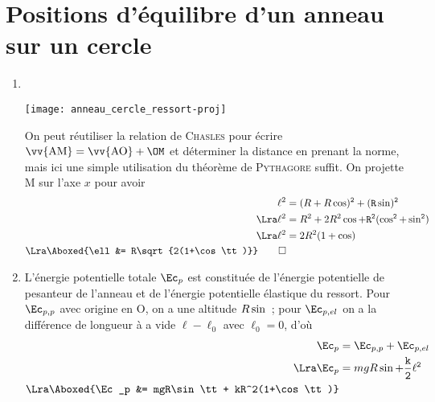 \documentclass[a4paper, 12pt, final, garamond]{book}
\begin{document}
\section{Positions d'équilibre d'un anneau sur un cercle}
\begin{enumerate}
    \item
        \begin{minipage}[t]{0.25\linewidth}
            ~
            \begin{center}
                \texttt{[image: anneau\_cercle\_ressort-proj]}
                \captionsetup{justification=centering}
                \label{fig:anncercproj}
            \end{center}
        \end{minipage}
        \hfill
        \begin{minipage}[t]{0.70\linewidth}
            On peut réutiliser la relation de \textsc{Chasles} pour écrire
            $\vv{\rm AM} = \vv{\rm AO} + \OM$ et déterminer la distance en prenant
            la norme, mais ici une simple utilisation du théorème de
            \textsc{Pythagore} suffit. On projette M sur l'axe $x$ pour avoir
            \begin{align*}
                \ell^2 &= (R+R\cos\tt)^2 + (R\sin\tt)^2
                \\\Lra
                \ell^2 &= R^2 + 2R^2\cos\tt + R^2(\cos^2\tt + \sin^2\tt)
                \\\Lra
                \ell^2 &= 2R^2(1+\cos\tt)
                \\\Lra
                \Aboxed{\ell &= R\sqrt{2(1+\cos\tt)}}
                \qed
            \end{align*}
        \end{minipage} \bigbreak
    \item L'énergie potentielle totale $\Ec_p$ est constituée de l'énergie
        potentielle de pesanteur de l'anneau et de l'énergie potentielle
        élastique du ressort. Pour $\Ec_{p,p}$ avec origine en O, on a une
        altitude $R\sin\tt$~; pour $\Ec_{p,el}$ on a la différence de longueur à
        a vide $\ell -\ell_0$ avec $\ell_0 = 0$, d'où
        \begin{align*}
            \Ec_p &= \Ec_{p,p} + \Ec_{p,el}
            \\\Lra
            \Ec_p &= mgR\sin\tt + \frac{k}{2}\ell^2
            \\\Lra
            \Aboxed{\Ec_p &= mgR\sin\tt + kR^2(1+\cos\tt)}

\end{align*}
\end{enumerate}
\end{document}
